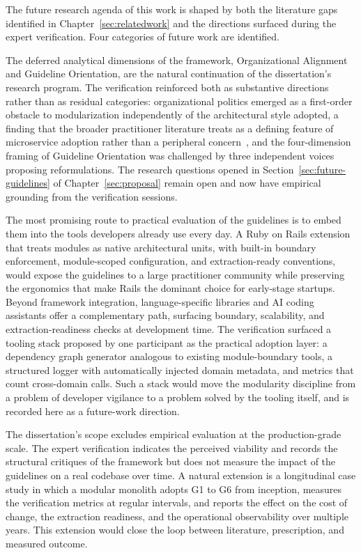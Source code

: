 The future research agenda of this work is shaped by both the literature gaps identified in Chapter~\ref{sec:relatedwork} and the directions surfaced during the expert verification. Four categories of future work are identified.

The deferred analytical dimensions of the framework, Organizational Alignment and Guideline Orientation, are the natural continuation of the dissertation's research program. The verification reinforced both as substantive directions rather than as residual categories: organizational politics emerged as a first-order obstacle to modularization independently of the architectural style adopted, a finding that the broader practitioner literature treats as a defining feature of microservice adoption rather than a peripheral concern~\cite{vitharana2024challenges}, and the four-dimension framing of Guideline Orientation was challenged by three independent voices proposing reformulations. The research questions opened in Section~\ref{sec:future-guidelines} of Chapter~\ref{sec:proposal} remain open and now have empirical grounding from the verification sessions.

The most promising route to practical evaluation of the guidelines is to embed them into the tools developers already use every day. A Ruby on Rails extension that treats modules as native architectural units, with built-in boundary enforcement, module-scoped configuration, and extraction-ready conventions, would expose the guidelines to a large practitioner community while preserving the ergonomics that make Rails the dominant choice for early-stage startups. Beyond framework integration, language-specific libraries and AI coding assistants offer a complementary path, surfacing boundary, scalability, and extraction-readiness checks at development time. The verification surfaced a tooling stack proposed by one participant as the practical adoption layer: a dependency graph generator analogous to existing module-boundary tools, a structured logger with automatically injected domain metadata, and metrics that count cross-domain calls. Such a stack would move the modularity discipline from a problem of developer vigilance to a problem solved by the tooling itself, and is recorded here as a future-work direction.

The dissertation's scope excludes empirical evaluation at the production-grade scale. The expert verification indicates the perceived viability and records the structural critiques of the framework but does not measure the impact of the guidelines on a real codebase over time. A natural extension is a longitudinal case study in which a modular monolith adopts G1 to G6 from inception, measures the verification metrics at regular intervals, and reports the effect on the cost of change, the extraction readiness, and the operational observability over multiple years. This extension would close the loop between literature, prescription, and measured outcome.

